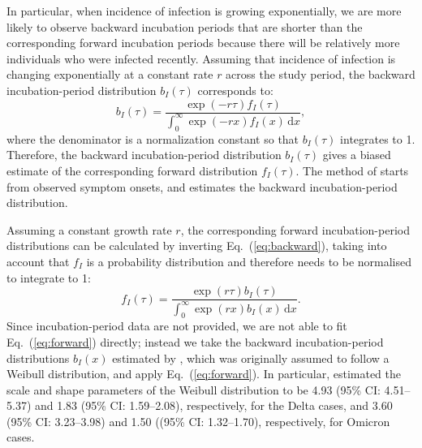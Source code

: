 \documentclass[12pt]{article}
\newcommand{\eref}[1]{Eq.~(\ref{eq:#1})}
\newcommand{\dd}[1]{\ensuremath{\, \mathrm{d}#1}}
\newcommand{\dx}{\dd{x}}
\begin{document}
In particular, when incidence of infection is growing exponentially, we are more likely to observe backward incubation periods that are shorter than the corresponding forward incubation periods because there will be relatively more individuals who were infected recently.
Assuming that incidence of infection is changing exponentially at a constant rate $r$ across the study period, the backward incubation-period distribution $b_I(\tau)$ corresponds to:
\begin{equation}
b_I(\tau) =\frac{ \exp(-r\tau) f_I(\tau)}{\int_0^\infty \exp(-r x) f_I(x)  \dx},
\label{eq:backward}
\end{equation}
where the denominator is a normalization constant so that $b_I(\tau)$ integrates to 1.
Therefore, the backward incubation-period distribution $b_I(\tau)$ gives a biased estimate of the corresponding forward distribution $f_I(\tau)$.
The method of \cite{backer2020incubation} starts from observed symptom onsets, and estimates the backward incubation-period distribution.

Assuming a constant growth rate $r$, the corresponding forward incubation-period distributions can be calculated by inverting \eref{backward}, taking into account that $f_I$ is a probability distribution and therefore needs to be normalised to integrate to 1:
\begin{equation}
f_I(\tau) = \frac{\exp(r\tau) b_I(\tau) }{\int_0^\infty \exp(rx) b_I(x)\dx}.
\label{eq:forward}
\end{equation}
Since incubation-period data are not provided, we are not able to fit \eref{forward} directly; 
instead we take the backward incubation-period distributions $b_I(x)$ estimated by \cite{backer2021omicron}, which was originally assumed to follow a Weibull distribution, and apply \eref{forward}.
In particular, \cite{backer2021omicron} estimated the scale and shape parameters of the Weibull distribution to be 4.93 (95\% CI: 4.51--5.37) and 1.83 (95\% CI: 1.59--2.08), respectively, for the Delta cases, and 3.60 (95\% CI: 3.23--3.98) and 1.50 ((95\% CI: 1.32--1.70), respectively, for Omicron cases.
\end{document}
